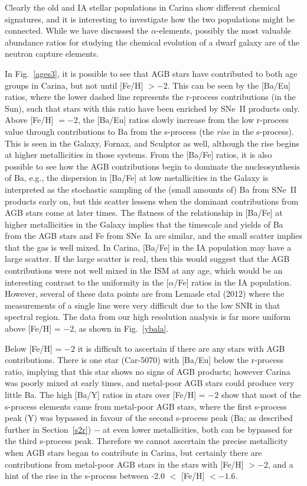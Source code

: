 \documentclass{emulateapj}
\begin{document}
Clearly the old and IA stellar populations in Carina show different chemical
signatures, and it is interesting to investigate how the two populations
might be connected.  While we have discussed the $\alpha$-elements, 
possibly the most valuable abundance ratios for studying the chemical
evolution of a dwarf galaxy are of the neutron capture elements.

In Fig.~\ref{ages3}, it is possible to see that AGB stars have contributed 
to both age groups in Carina, but not until [Fe/H] $> -2$.    
This can be seen by the [Ba/Eu] ratios, where the lower dashed line represents 
the r-process contributions (in the Sun), such that stars with this ratio
have been enriched by SNe~II products only.  
Above [Fe/H] $= -2$, the [Ba/Eu] ratios slowly increase from the low
r-process value through contributions to Ba from the s-process 
(the {\it rise} in the s-process).   This is seen in the Galaxy,
Fornax, and Sculptor as well, although the rise begins at higher 
metallicities in those systems.
%
From the [Ba/Fe] ratios, it is also possible to see how the 
AGB contributions begin to dominate the nucleosynthesis of Ba, 
e.g., the dispersion in [Ba/Fe] at low metallicities in the Galaxy
is interpreted as the stochastic sampling of the (small amounts of)
Ba from SNe~II products early on, 
but this scatter lessens when the dominant contributions 
from AGB stars come at later times.   The flatness of the relationship 
in [Ba/Fe] at higher metallicities in the Galaxy implies that 
the timescale and yields of Ba from the AGB stars and Fe from 
SNe~Ia are similar, and the small scatter implies that the 
gas is well mixed.
In Carina, [Ba/Fe] in the IA population may have a large scatter.
If the large scatter is real, then this would suggest that the 
AGB contributions were not well mixed in the ISM at any age,
which would be an interesting contrast to the uniformity in
the [$\alpha$/Fe] ratios in the IA population.   However, several
of these data points are from Lemasle etal (2012) where the 
measurements of a single  line were very difficult 
due to the low SNR in that spectral region.    The data from our
high resolution analysis is far more uniform above [Fe/H] = $-2$, 
as shown in Fig.~\ref{ybala}.
 
Below [Fe/H] = $-2$ it is difficult to ascertain if there are any 
stars with AGB contributions.   There is one star (Car-5070) 
with [Ba/Eu] below the r-process ratio, implying that this star 
shows no signs of AGB products; however Carina was poorly mixed 
at early times, and metal-poor AGB stars could produce very 
little Ba.   The high [Ba/Y] ratios in stars over 
[Fe/H] = $-2$ show that most of the s-process elements came from 
metal-poor AGB stars, where the first s-process peak (Y) was 
bypassed in favour of the second s-process peak (Ba; as 
described further in Section~\ref{s2r}) $-$ at even lower 
metallicities, both can be bypassed for the third s-process peak.  
%
Therefore we cannot ascertain the precise metallicity when AGB stars
began to contribute in Carina, but certainly there are contributions
from metal-poor AGB stars in the stars with [Fe/H] $> -2$, and a hint
of the rise in the s-process between -2.0 $<$ [Fe/H] $< -1.6$. 
\end{document}
